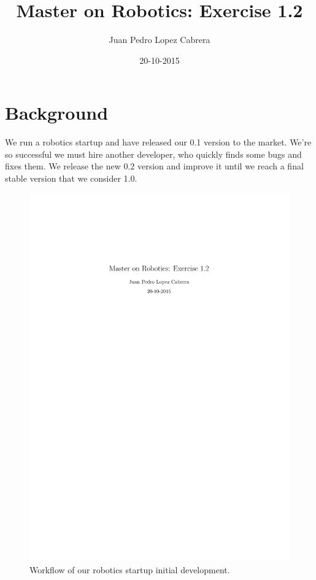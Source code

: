 \documentclass[a4paper]{article}
\title{Master on Robotics: Exercise 1.2}
\date{20-10-2015}
\author{Juan Pedro Lopez Cabrera}
\begin{document}
  \maketitle

  \newpage

  \section{Background}
  We run a robotics startup and have released our 0.1 version to the market. We're so successful we must hire another developer, who quickly finds some bugs and fixes them. We release the new 0.2 version and improve it until we reach a final stable version that we consider 1.0.

  \begin{figure}[ht]
    \centering
    \includegraphics[scale=0.8]{Exercise_1_2}
    \caption{Workflow of our robotics startup initial development.}
    \label{fig:connections1}
  \end{figure}
\end{document}
